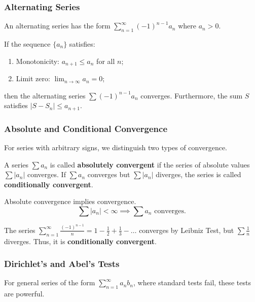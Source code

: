 \subsubsection{Alternating Series}
An alternating series has the form $\sum_{n=1}^{\infty} (-1)^{n-1} a_n$ where $a_n > 0$.

\begin{theorem}
If the sequence $\{a_n\}$ satisfies:
\begin{enumerate}
    \item Monotonicity: $a_{n+1} \le a_n$ for all $n$;
    \item Limit zero: $\lim_{n \to \infty} a_n = 0$;
\end{enumerate}
then the alternating series $\sum (-1)^{n-1} a_n$ converges.
Furthermore, the sum $S$ satisfies $|S - S_n| \le a_{n+1}$.
\end{theorem}

\subsubsection{Absolute and Conditional Convergence}
For series with arbitrary signs, we distinguish two types of convergence.

\begin{definition}
A series $\sum a_n$ is called \textbf{absolutely convergent} if the series of absolute values $\sum |a_n|$ converges.
If $\sum a_n$ converges but $\sum |a_n|$ diverges, the series is called \textbf{conditionally convergent}.
\end{definition}

\begin{theorem}
Absolute convergence implies convergence.
\[ \sum |a_n| < \infty \implies \sum a_n \text{ converges}. \]
\end{theorem}

\begin{example}
The series $\sum_{n=1}^{\infty} \frac{(-1)^{n-1}}{n} = 1 - \frac{1}{2} + \frac{1}{3} - \dots$ converges by Leibniz Test, but $\sum \frac{1}{n}$ diverges. Thus, it is \textbf{conditionally convergent}.
\end{example}

\subsubsection{Dirichlet's and Abel's Tests}
For general series of the form $\sum_{n=1}^{\infty} a_n b_n$, where standard tests fail, these tests are powerful.

